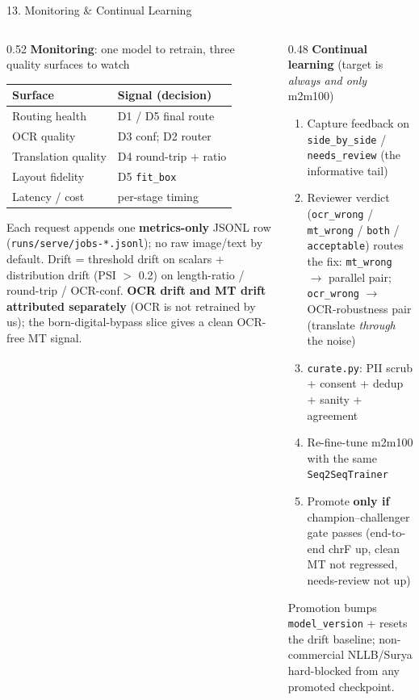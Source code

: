 \documentclass[10pt,aspectratio=169]{beamer}
\begin{document}
\begin{frame}{13. Monitoring \& Continual Learning}
\begin{columns}[T]
\begin{column}{0.52\textwidth}
\textbf{Monitoring}: one model to retrain, three quality surfaces to watch
\begin{table}[h]
\centering\scriptsize
\begin{tabular}{ll}
\toprule
\textbf{Surface} & \textbf{Signal (decision)} \\
\midrule
Routing health & D1 / D5 final route \\
OCR quality & D3 conf; D2 router \\
Translation quality & D4 round-trip + ratio \\
Layout fidelity & D5 \texttt{fit\_box} \\
Latency / cost & per-stage timing \\
\bottomrule
\end{tabular}
\end{table}
\scriptsize Each request appends one \textbf{metrics-only} JSONL row (\texttt{runs/serve/jobs-*.jsonl}); no raw image/text by default. Drift = threshold drift on scalars + distribution drift (PSI $>$ 0.2) on length-ratio / round-trip / OCR-conf. \textbf{OCR drift and MT drift attributed separately} (OCR is not retrained by us); the born-digital-bypass slice gives a clean OCR-free MT signal.
\end{column}
\begin{column}{0.48\textwidth}
\textbf{Continual learning} (target is \emph{always and only} m2m100)
\begin{enumerate}\scriptsize
  \item Capture feedback on \texttt{side\_by\_side} / \texttt{needs\_review} (the informative tail)
  \item Reviewer verdict (\texttt{ocr\_wrong} / \texttt{mt\_wrong} / \texttt{both} / \texttt{acceptable}) routes the fix: \texttt{mt\_wrong} $\rightarrow$ parallel pair; \texttt{ocr\_wrong} $\rightarrow$ OCR-robustness pair (translate \emph{through} the noise)
  \item \texttt{curate.py}: PII scrub + consent + dedup + sanity + agreement
  \item Re-fine-tune m2m100 with the same \texttt{Seq2SeqTrainer}
  \item Promote \textbf{only if} champion--challenger gate passes (end-to-end chrF up, clean MT not regressed, needs-review not up)
\end{enumerate}
\scriptsize Promotion bumps \texttt{model\_version} + resets the drift baseline; non-commercial NLLB/Surya hard-blocked from any promoted checkpoint.
\end{column}
\end{columns}
\end{frame}
\end{document}
